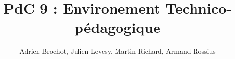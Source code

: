 \documentclass[a4paper]{article}
\begin{document}
\title{PdC 9 : Environement Technico-pédagogique}
\author{Adrien Brochot, Julien Levesy, Martin Richard, Armand Rossius}

\maketitle


\newpage
\tableofcontents
\newpage

\newpage
\end{document}
